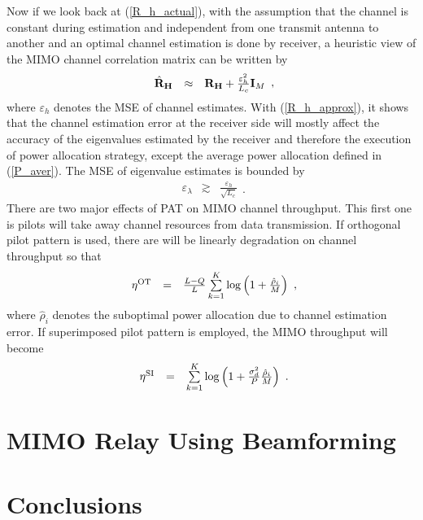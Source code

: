 \documentclass[10pt,fleqn, twocolumn]{IEEEtran}
\newcommand{\bH}{{\bf H}}
\newcommand{\bI}{{\bf I}}
\newcommand{\bR}{{\bf R}}
\begin{document}
Now if we look back at (\ref{R_h_actual}), with the assumption
that the channel is constant during estimation and independent
from one transmit antenna to another and an optimal channel
estimation is done by receiver, a heuristic view of the MIMO
channel correlation matrix can be written by
\begin{equation}
\begin{array}{rcl}
\hat{\bR}_{\bH}&\approx&\bR_{\bH}+\frac{\varepsilon_{h}^2}{L_{c}}\bI_{M}
\end{array},\label{R_h_approx}
\end{equation}
\noindent where $\varepsilon_{h}$ denotes the MSE of channel
estimates. With (\ref{R_h_approx}), it shows that the channel
estimation error at the receiver side will mostly affect the
accuracy of the eigenvalues estimated by the receiver and
therefore the execution of power allocation strategy, except the
average power allocation defined in (\ref{P_aver}). The MSE of
eigenvalue estimates is bounded by
\begin{equation}
\begin{array}{rcl}
\varepsilon_{\lambda}&\gtrsim&\frac{\varepsilon_{h}}{\sqrt{L_{c}}}
\end{array}.\label{eigenvalue_bound}
\end{equation}
There are two major effects of PAT on MIMO channel throughput.
This first one is pilots will take away channel resources from
data transmission.  If orthogonal pilot pattern is used, there are
will be linearly degradation on channel throughput so that
\begin{equation}%
\begin{array}{rcl}
\eta^{\rm OT}& =&\frac{L-Q}{L}
\sum\limits_{k=1}^{K}\log\left(1+\frac{\hat{\rho}_{i}}{M}\right)
\end{array},\label{spectral_eff_OT}
\end{equation}
\noindent where $\hat{\rho}_{i}$ denotes the suboptimal power
allocation due to channel estimation error. If superimposed pilot
pattern is employed, the MIMO throughput will become
\begin{equation}%
\begin{array}{rcl}
\eta^{\rm
SI}&=&\sum\limits_{k=1}^{K}\log\left(1+\frac{\sigma_{d}^{2}}{P}\frac{\hat{\rho}_{i}}{M}\right)
\end{array}.\label{spectral_eff_OT}
\end{equation}
\section{MIMO Relay Using Beamforming}
\section{Conclusions}

\small


\end{document}
